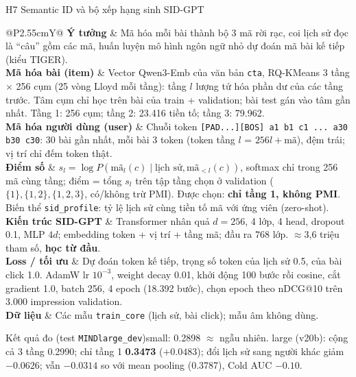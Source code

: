 \documentclass[aspectratio=169,t]{beamer}
\makeatletter
\newcommand{\code}[1]{\texttt{#1}}
\newcommand{\bangmota}[1]{{\scriptsize\renewcommand{\arraystretch}{1.1}\setlength{\tabcolsep}{4pt}%
  \begin{tabularx}{\textwidth}{@{}P{2.55cm}Y@{}}\toprule #1 \bottomrule\end{tabularx}}}
\newcommand{\rw}[2]{\textbf{#1} & #2\\ \midrule}
\newcommand{\rwl}[2]{\textbf{#1} & #2\\}
\newcommand{\ketqua}[1]{\begin{exampleblock}{Kết quả đo (test \code{MINDlarge\_dev})}\scriptsize #1\end{exampleblock}}
\makeatother
\begin{document}
\begin{frame}[shrink]{H7 \textperiodcentered{} Semantic ID và bộ xếp hạng sinh SID-GPT}
\bangmota{
\rw{Ý tưởng}{Mã hóa mỗi bài thành bộ 3 mã rời rạc, coi lịch sử đọc là ``câu'' gồm các mã, huấn luyện mô hình ngôn ngữ nhỏ dự đoán mã bài kế tiếp (kiểu TIGER).}
\rw{Mã hóa bài (item)}{Vector Qwen3-Emb của văn bản \code{cta}, RQ-KMeans 3 tầng $\times$ 256 cụm (25 vòng Lloyd mỗi tầng): tầng $l$ lượng tử hóa phần dư của các tầng trước. Tâm cụm chỉ học trên bài của train + validation; bài test gán vào tâm gần nhất. Tầng 1: 256 cụm; tầng 2: 23.416 tiền tố; tầng 3: 79.962.}
\rw{Mã hóa người dùng (user)}{Chuỗi token \code{[PAD...][BOS] a1 b1 c1 ... a30 b30 c30}: 30 bài gần nhất, mỗi bài 3 token (token tầng $l$ = $256l+\text{mã}$), đệm trái; vị trí chỉ đếm token thật.}
\rw{Điểm số}{$s_l=\log P(\text{mã}_l(c)\mid\text{lịch sử},\text{mã}_{<l}(c))$, softmax chỉ trong 256 mã cùng tầng; điểm = tổng $s_l$ trên tập tầng chọn ở validation ($\{1\},\{1,2\},\{1,2,3\}$, có/không trừ PMI). Được chọn: \textbf{chỉ tầng 1, không PMI}. Biến thể \code{sid\_profile}: tỷ lệ lịch sử cùng tiền tố mã với ứng viên (zero-shot).}
\rw{Kiến trúc SID-GPT}{Transformer nhân quả $d=256$, 4 lớp, 4 head, dropout 0.1, MLP $4d$; embedding token + vị trí + tầng mã; đầu ra $768$ lớp. $\approx$3,6 triệu tham số, \textbf{học từ đầu}.}
\rw{Loss / tối ưu}{Dự đoán token kế tiếp, trọng số token của lịch sử 0.5, của bài click 1.0. AdamW lr $10^{-3}$, weight decay 0.01, khởi động 100 bước rồi cosine, cắt gradient 1.0, batch 256, 4 epoch (18.392 bước), chọn epoch theo nDCG@10 trên 3.000 impression validation.}
\rwl{Dữ liệu}{Các mẫu \code{train\_core} (lịch sử, bài click); mẫu âm không dùng.}
}
\ketqua{small: 0.2898 $\approx$ ngẫu nhiên. large (v20b): cộng cả 3 tầng 0.2990; chỉ tầng 1 \textbf{0.3473} ($+0.0483$); đổi lịch sử sang người khác giảm $-0.0626$; vẫn $-0.0314$ so với mean pooling (0.3787), Cold AUC $-0.10$.}
\par\kern0pt
\end{frame}
\end{document}
